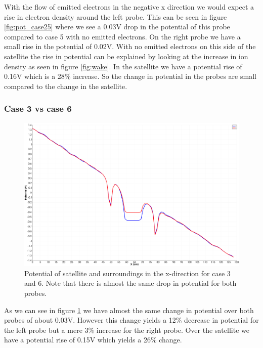 With the flow of emitted electrons in the negative x direction we would expect a rise in electron density around the left probe.
This can be seen in figure \ref{fig:pot_case25} where we see a 0.03V drop in the potential of this probe compared to case 5 with no emitted
electrons. On the right probe we have a small rise in the potential of 0.02V. With no emitted electrons on this side of the satellite the rise in
potential can be explained by looking at the increase in ion density as seen in figure \ref{fig:wake}.
In the satellite we have a potential rise of 0.16V which is a 28\% increase. So the change in potential in the probes are small compared to the change in the satellite.

\subsubsection{Case 3 vs case 6}

\begin{figure}
    \centering
    \includegraphics[width = 0.6 \textwidth]{images/pot_case36_new2.png}
    \caption{Potential of satellite and surroundings in the x-direction for case 3 and 6. Note that there is almost the same drop in potential for both probes.}
    \label{fig:pot_case36}
\end{figure}

As we can see in figure \ref{fig:pot_case36} we have almost the same change in potential over
both probes of about 0.03V. However this change yields a 12\% decrease in potential for the left
probe but a mere 3\% increase for the right probe. Over the satellite we have a potential rise of 0.15V which yields a 26\% change.
